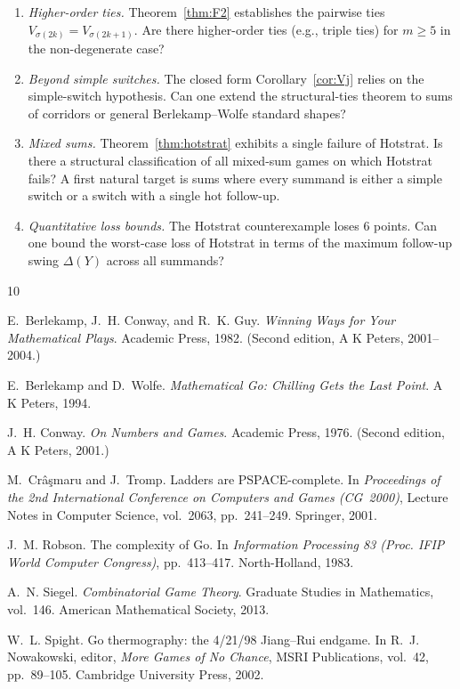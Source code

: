 \documentclass[11pt,a4paper]{amsart}
\theoremstyle{definition}
\theoremstyle{remark}
\begin{document}
\begin{enumerate}[label=\arabic*.]
\item \emph{Higher-order ties.} Theorem~\ref{thm:F2} establishes the
  pairwise ties $V_{\sigma(2k)} = V_{\sigma(2k+1)}$. Are there
  higher-order ties (e.g., triple ties) for $m \geq 5$ in the
  non-degenerate case?
\item \emph{Beyond simple switches.} The closed form
  Corollary~\ref{cor:Vj} relies on the simple-switch hypothesis. Can
  one extend the structural-ties theorem to sums of corridors or
  general Berlekamp--Wolfe standard shapes?
\item \emph{Mixed sums.} Theorem~\ref{thm:hotstrat} exhibits a single
  failure of Hotstrat. Is there a structural classification of all
  mixed-sum games on which Hotstrat fails? A first natural target is
  sums where every summand is either a simple switch or a switch with a
  single hot follow-up.
\item \emph{Quantitative loss bounds.} The Hotstrat counterexample loses
  $6$ points. Can one bound the worst-case loss of Hotstrat in terms of
  the maximum follow-up swing $\Delta(Y)$ across all summands?
\end{enumerate}

\begin{thebibliography}{10}

E.~Berlekamp, J.~H. Conway, and R.~K. Guy.
\newblock \emph{Winning Ways for Your Mathematical Plays}.
\newblock Academic Press, 1982. (Second edition, A K Peters, 2001--2004.)

E.~Berlekamp and D.~Wolfe.
\newblock \emph{Mathematical Go: Chilling Gets the Last Point}.
\newblock A K Peters, 1994.

J.~H. Conway.
\newblock \emph{On Numbers and Games}.
\newblock Academic Press, 1976. (Second edition, A K Peters, 2001.)

M.~Cr\^{a}\c{s}maru and J.~Tromp.
\newblock Ladders are {PSPACE}-complete.
\newblock In \emph{Proceedings of the 2nd International Conference on Computers
  and Games (CG~2000)}, Lecture Notes in Computer Science, vol.~2063,
  pp.~241--249. Springer, 2001.

J.~M. Robson.
\newblock The complexity of {G}o.
\newblock In \emph{Information Processing 83 (Proc. IFIP World Computer
  Congress)}, pp.~413--417. North-Holland, 1983.

A.~N. Siegel.
\newblock \emph{Combinatorial Game Theory}.
\newblock Graduate Studies in Mathematics, vol.~146. American Mathematical
  Society, 2013.

W.~L. Spight.
\newblock Go thermography: the 4/21/98 Jiang--Rui endgame.
\newblock In R.~J. Nowakowski, editor, \emph{More Games of No Chance},
  MSRI Publications, vol.~42, pp.~89--105. Cambridge University Press, 2002.

\end{thebibliography}
\end{document}
